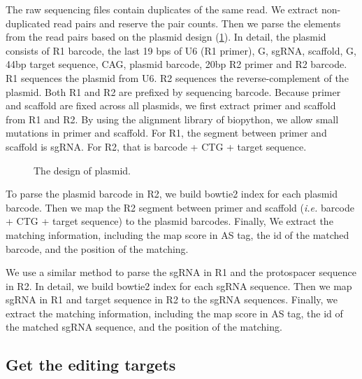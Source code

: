 \documentclass{article}
\begin{document}
The raw sequencing files contain duplicates of the same read. We extract non-duplicated read pairs and reserve the pair counts. Then we parse the elements from the read pairs based on the plasmid design (\cref{fig:plasmid_design}). In detail, the plasmid consists of R1 barcode, the last 19 bps of U6 (R1 primer), G, sgRNA, scaffold, G, 44bp target sequence, CAG, plasmid barcode, 20bp R2 primer and R2 barcode. R1 sequences the plasmid from U6. R2 sequences the reverse-complement of the plasmid. Both R1 and R2 are prefixed by sequencing barcode. Because primer and scaffold are fixed across all plasmids, we first extract primer and scaffold from R1 and R2. By using the alignment library of biopython, we allow small mutations in primer and scaffold. For R1, the segment between primer and scaffold is sgRNA. For R2, that is barcode + CTG + target sequence.
\begin{figure}[H]
  \centering
  \caption{The design of plasmid.}\label{fig:plasmid_design}
\end{figure}

To parse the plasmid barcode in R2, we build bowtie2 index for each plasmid barcode. Then we map the R2 segment between primer and scaffold ({\it i.e.} barcode + CTG + target sequence) to the plasmid barcodes. Finally, We extract the matching information, including the map score in AS tag, the id of the matched barcode, and the position of the matching.

We use a similar method to parse the sgRNA in R1 and the protospacer sequence in R2. In detail, we build bowtie2 index for each sgRNA sequence. Then we map sgRNA in R1 and target sequence in R2 to the sgRNA sequences. Finally, we extract the matching information, including the map score in AS tag, the id of the matched sgRNA sequence, and the position of the matching.

\subsection{Get the editing targets}
\end{document}
